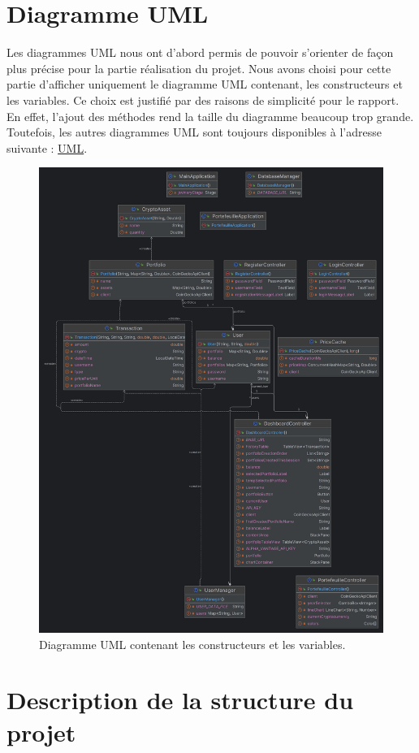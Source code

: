 \documentclass[12pt]{article}
\begin{document}
\section{Diagramme UML}
Les diagrammes UML nous ont d'abord permis de pouvoir s'orienter de façon plus précise pour la partie réalisation du projet. Nous avons choisi pour cette partie d'afficher uniquement le diagramme UML contenant, les constructeurs et les variables. Ce choix est justifié par des raisons de simplicité pour le rapport. En effet, l'ajout des méthodes rend la taille du diagramme beaucoup trop grande. Toutefois, les autres diagrammes UML sont toujours disponibles à l'adresse suivante : \href{https://ibb.co/WnzWVmF}{UML}.
\begin{figure}[H]
    \centering
    \includegraphics[width=0.7\linewidth]{UML1.jpg}
    \caption{Diagramme UML contenant les constructeurs et les variables.}
    \label{fig:enter-label}
\end{figure}
\newpage
\section{Description de la structure du projet}
\end{document}
